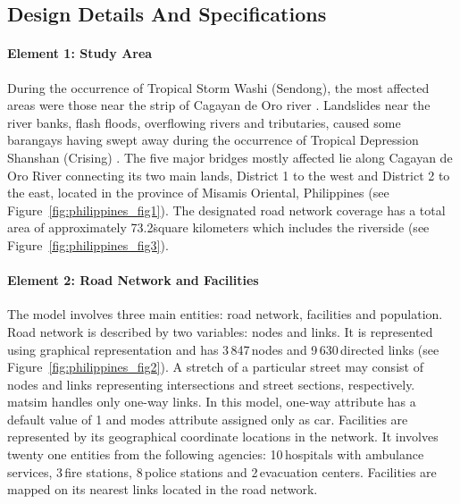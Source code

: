 \subsection{Design Details And Specifications}
\paragraph{Element 1: Study Area}
During the occurrence of Tropical Storm Washi (Sendong), the most affected areas were those near the strip of Cagayan de Oro river \citep[][]{Ramos_TechRep_NDRRMC_2011}. Landslides near the river banks, flash floods, overflowing rivers and tributaries, caused some barangays having swept away during the occurrence of Tropical Depression Shanshan (Crising) \citep[][]{Delrosario_TechRep_NDRRMC_2011}. The five major bridges mostly affected lie along Cagayan de Oro River connecting its two main lands, District 1 to the west and District 2 to the east, located in the province of Misamis Oriental, Philippines (see Figure~\ref{fig:philippines_fig1}). The designated road network coverage has a total area of approximately 73.2\.square kilometers which includes the riverside (see Figure~\ref{fig:philippines_fig3}). 

\paragraph{Element 2: Road Network and Facilities}
The model involves three main entities: road network, facilities and population. Road network is described by two variables: nodes and links. It is represented using graphical representation and has 3\,847\,nodes and 9\,630\,directed links (see Figure~\ref{fig:philippines_fig2}). A stretch of a particular street may consist of nodes and links representing intersections and street sections, respectively. \gls{matsim} handles only one-way links. In this model, one-way attribute has a default value of 1 and modes attribute assigned only as car. Facilities are represented by its geographical coordinate locations in the network. It involves twenty one entities from the following agencies: 10\,hospitals with ambulance services, 3\,fire stations, 8\,police stations and 2\,evacuation centers. Facilities are mapped on its nearest links located in the road network.

